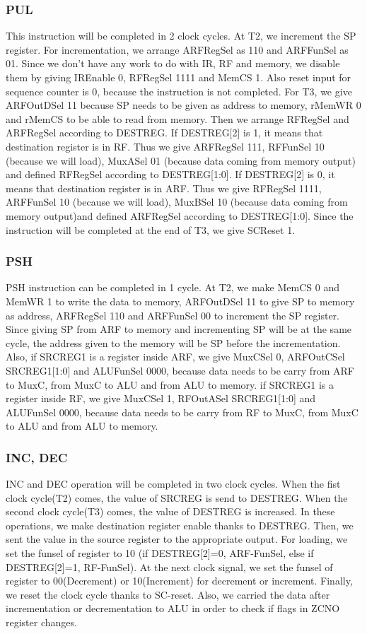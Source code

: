 \documentclass[pdftex,12pt,a4paper]{article}
\begin{document}
\subsubsection{PUL}
This instruction will be completed in 2 clock cycles. At T2, we increment the SP register. For incrementation, we arrange ARFRegSel as 110 and ARFFunSel as 01. Since we don't have any work to do with IR, RF and memory, we disable them by giving IREnable 0, RFRegSel 1111 and MemCS 1. Also reset input for sequence counter is 0, because the instruction is not completed. For T3, we give ARFOutDSel 11 because SP needs to be given as address to memory, rMemWR 0 and rMemCS to be able to read from memory. Then we arrange RFRegSel and ARFRegSel according to DESTREG. If DESTREG[2] is 1, it means that destination register is in RF. Thus we give ARFRegSel 111, RFFunSel 10 (because we will load), MuxASel 01 (because data coming from memory output) and defined RFRegSel according to DESTREG[1:0]. If DESTREG[2] is 0, it means that destination register is in ARF. Thus we give RFRegSel 1111, ARFFunSel 10 (because we will load), MuxBSel 10 (because data coming from memory output)and defined ARFRegSel according to DESTREG[1:0].
Since the instruction will be completed at the end of T3, we give SCReset 1.
\subsubsection{PSH}
PSH instruction can be completed in 1 cycle. At T2, we make MemCS 0 and MemWR 1 to write the data to memory, ARFOutDSel 11 to give SP to memory as address, ARFRegSel 110 and ARFFunSel 00 to increment the SP register. Since giving SP from ARF to memory and incrementing SP will be at the same cycle, the address given to the memory will be SP before the incrementation. Also, if SRCREG1 is a register inside ARF, we give MuxCSel 0, ARFOutCSel SRCREG1[1:0] and ALUFunSel 0000, because data needs to be carry from ARF to MuxC, from MuxC to ALU and from ALU to memory. if SRCREG1 is a register inside RF, we give MuxCSel 1, RFOutASel SRCREG1[1:0] and ALUFunSel 0000, because data needs to be carry from RF to MuxC, from MuxC to ALU and from ALU to memory.

\subsubsection{INC, DEC}
INC and DEC operation will be completed in two clock cycles. When the fist clock cycle(T2) comes, the value of SRCREG is send to DESTREG. When the second clock cycle(T3) comes, the value of DESTREG is increased. In these operations, we make destination register enable thanks to DESTREG. Then, we sent the value in the source register to the appropriate output. For loading, we set the funsel of register to 10 (if DESTREG[2]=0, ARF-FunSel, else if DESTREG[2]=1, RF-FunSel). At the next clock signal, we set the funsel of register to 00(Decrement) or 10(Increment) for decrement or increment. Finally, we reset the clock cycle thanks to SC-reset. Also, we carried the data after incrementation or decrementation to ALU in order to check if flags in ZCNO register changes.
\end{document}
